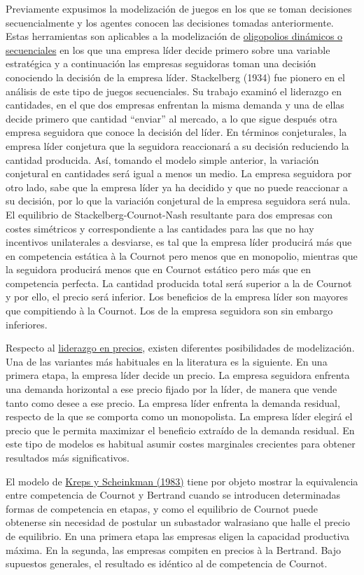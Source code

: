 \documentclass{nuevotema}
\begin{document}
Previamente expusimos la modelización de juegos en los que se toman decisiones secuencialmente y los agentes conocen las decisiones tomadas anteriormente. Estas herramientas son aplicables a la modelización de \underline{oligopolios dinámicos o secuenciales} en los que una empresa líder decide primero sobre una variable estratégica y a continuación las empresas seguidoras toman una decisión conociendo la decisión de la empresa líder. Stackelberg (1934) fue pionero en el análisis de este tipo de juegos secuenciales. Su trabajo examinó el liderazgo en cantidades, en el que dos empresas enfrentan la misma demanda y una de ellas decide primero que cantidad ``enviar'' al mercado, a lo que sigue después otra empresa seguidora que conoce la decisión del líder. En términos conjeturales, la empresa líder conjetura que la seguidora reaccionará a su decisión reduciendo la cantidad producida. Así, tomando el modelo simple anterior, la variación conjetural en cantidades será igual a menos un medio. La empresa seguidora por otro lado, sabe que la empresa líder ya ha decidido y que no puede reaccionar a su decisión, por lo que la variación conjetural de la empresa seguidora será nula. El equilibrio de Stackelberg-Cournot-Nash resultante para dos empresas con costes simétricos y correspondiente a las cantidades para las que no hay incentivos unilaterales a desviarse, es tal que la empresa líder producirá más que en competencia estática à la Cournot pero menos que en monopolio, mientras que la seguidora producirá menos que en Cournot estático pero más que en competencia perfecta. La cantidad producida total será superior a la de Cournot y por ello, el precio será inferior. Los beneficios de la empresa líder son mayores que compitiendo à la Cournot. Los de la empresa seguidora son sin embargo inferiores. 

Respecto al \underline{liderazgo en precios}, existen diferentes posibilidades de modelización. Una de las variantes más habituales en la literatura es la siguiente. En una primera etapa, la empresa líder decide un precio. La empresa seguidora enfrenta una demanda horizontal a ese precio fijado por la líder, de manera que vende tanto como desee a ese precio. La empresa líder enfrenta la demanda residual, respecto de la que se comporta como un monopolista. La empresa líder elegirá el precio que le permita maximizar el beneficio extraído de la demanda residual. En este tipo de modelos es habitual asumir costes marginales crecientes para obtener resultados más significativos.

El modelo de \underline{Kreps y Scheinkman (1983)} tiene por objeto mostrar la equivalencia entre competencia de Cournot y Bertrand cuando se introducen determinadas formas de competencia en etapas, y como el equilibrio de Cournot puede obtenerse sin necesidad de postular un subastador walrasiano que halle el precio de equilibrio. En una primera etapa las empresas eligen la capacidad productiva máxima. En la segunda, las empresas compiten en precios à la Bertrand. Bajo supuestos generales, el resultado es idéntico al de competencia de Cournot. 
\end{document}
